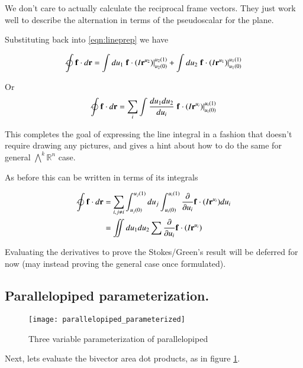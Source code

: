 \documentclass{article}
\newcommand{\PD}[2]{\frac{\partial {#2}}{\partial {#1}}}
\newcommand{\Rm}[1]{\mathbb{R}^{#1}}
\begin{document}
We don't care to actually calculate the reciprocal frame vectors.  They just work well to describe the alternation in terms of the pseudoscalar for the plane.

Substituting back into \ref{eqn:lineprep} we have

\begin{align*}
\ointclockwise \Bf \cdot d\Br
&=
\int du_1 \left.{\Bf \cdot \left(I \Br^{u_2}\right) }\right\vert_{u_2(0)}^{u_2(1)}
+\int du_2 \left.{\Bf \cdot \left(I \Br^{u_1}\right) }\right\vert_{u_1(0)}^{u_1(1)} \\
\end{align*}

Or
\begin{equation}\label{eqn:lineintegral}
\ointclockwise \Bf \cdot d\Br
=
\sum_{i} \int \frac{du_1 du_2}{du_i} \left.{\Bf \cdot \left(I \Br^{u_i}\right) }\right\vert_{u_i(0)}^{u_i(1)}
\end{equation}

This completes the goal of expressing the line integral in a fashion that doesn't require drawing any pictures,
and gives a hint about how to do the same for general ${\bigwedge}^k \Rm{n}$ case.

As before this can be written in terms of its integrals

\begin{align*}
\ointclockwise \Bf \cdot d\Br
&= \sum_{i, j \ne i} 
\int_{u_j(0)}^{u_j(1)} du_j
\int_{u_i(0)}^{u_i(1)}
 \PD{u_i}{} {\Bf \cdot \left(I \Br^{u_i}\right)} du_i \\
&= \iint du_1 du_2 \sum \PD{u_i}{} {\Bf \cdot \left(I \Br^{u_i}\right)}
\end{align*}

Evaluating the derivatives to prove the Stokes/Green's result will be deferred for now (may instead proving
the general case once formulated).

\subsection{ Parallelopiped parameterization. }

\begin{figure}[htp]
\centering
\texttt{[image: parallelopiped\_parameterized]}
\caption{Three variable parameterization of  parallelopiped}\label{fig:parallelopiped}
\end{figure}

Next, lets evaluate the bivector area dot products, as in figure \ref{fig:parallelopiped}.
\end{document}
